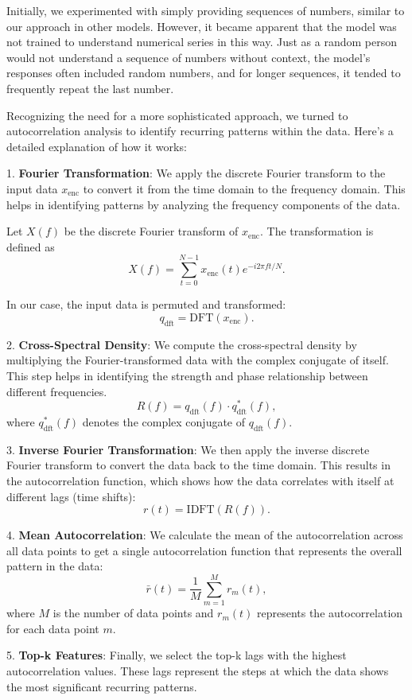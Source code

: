 Initially, we experimented with simply providing sequences of numbers, similar to our approach in other models. However, it became apparent that the model was not trained to understand numerical series in this way. Just as a random person would not understand a sequence of numbers without context, the model's responses often included random numbers, and for longer sequences, it tended to frequently repeat the last number.

Recognizing the need for a more sophisticated approach, we turned to autocorrelation analysis to identify recurring patterns within the data. Here’s a detailed explanation of how it works:

1. \textbf{Fourier Transformation}: We apply the discrete Fourier transform to the input data \( x_{\text{enc}} \) to convert it from the time domain to the frequency domain. This helps in identifying patterns by analyzing the frequency components of the data.

Let \( X(f) \) be the discrete Fourier transform of \( x_{\text{enc}} \). The transformation is defined as
\[
	X(f) = \sum_{t=0}^{N-1} x_{\text{enc}}(t) e^{-i 2 \pi f t / N}.
\]

In our case, the input data is permuted and transformed:
\[
	q_{\text{dft}} = \text{DFT}(x_{\text{enc}}).
\]

2. \textbf{Cross-Spectral Density}: We compute the cross-spectral density by multiplying the Fourier-transformed data with the complex conjugate of itself. This step helps in identifying the strength and phase relationship between different frequencies.
\[
	R(f) = q_{\text{dft}}(f) \cdot q_{\text{dft}}^*(f),
\]
where \( q_{\text{dft}}^*(f) \) denotes the complex conjugate of \( q_{\text{dft}}(f) \).

3. \textbf{Inverse Fourier Transformation}: We then apply the inverse discrete Fourier transform to convert the data back to the time domain. This results in the autocorrelation function, which shows how the data correlates with itself at different lags (time shifts):
\[
	r(t) = \text{IDFT}(R(f)).
\]

4. \textbf{Mean Autocorrelation}: We calculate the mean of the autocorrelation across all data points to get a single autocorrelation function that represents the overall pattern in the data:
\[
	\bar{r}(t) = \frac{1}{M} \sum_{m=1}^{M} r_m(t),
\]
where \( M \) is the number of data points and \( r_m(t) \) represents the autocorrelation for each data point \( m \).

5. \textbf{Top-k Features}: Finally, we select the top-k lags with the highest autocorrelation values. These lags represent the steps at which the data shows the most significant recurring patterns.

